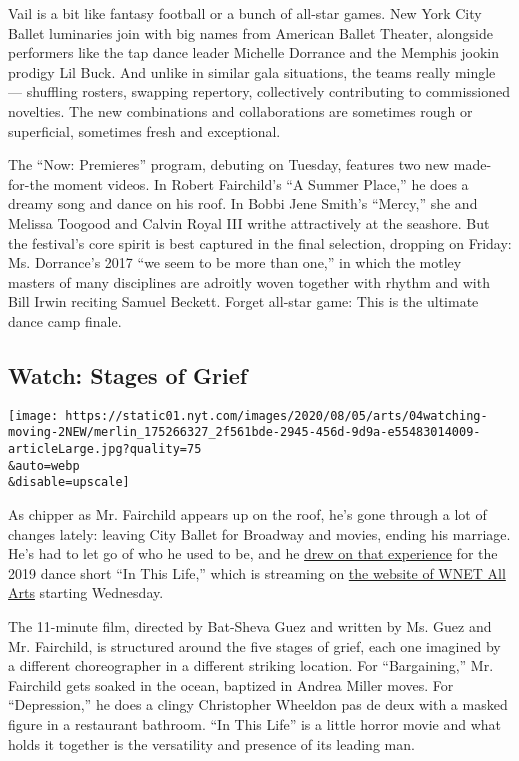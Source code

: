 Vail is a bit like fantasy football or a bunch of all-star games. New
York City Ballet luminaries join with big names from American Ballet
Theater, alongside performers like the tap dance leader Michelle
Dorrance and the Memphis jookin prodigy Lil Buck. And unlike in similar
gala situations, the teams really mingle --- shuffling rosters, swapping
repertory, collectively contributing to commissioned novelties. The new
combinations and collaborations are sometimes rough or superficial,
sometimes fresh and exceptional.

The ``Now: Premieres'' program, debuting on Tuesday, features two new
made-for-the moment videos. In Robert Fairchild's ``A Summer Place,'' he
does a dreamy song and dance on his roof. In Bobbi Jene Smith's
``Mercy,'' she and Melissa Toogood and Calvin Royal III writhe
attractively at the seashore. But the festival's core spirit is best
captured in the final selection, dropping on Friday: Ms. Dorrance's 2017
``we seem to be more than one,'' in which the motley masters of many
disciplines are adroitly woven together with rhythm and with Bill Irwin
reciting Samuel Beckett. Forget all-star game: This is the ultimate
dance camp finale.

\hypertarget{watch-stages-of-grief}{%
\subsection{Watch: Stages of Grief}\label{watch-stages-of-grief}}

\texttt{[image: https://static01.nyt.com/images/2020/08/05/arts/04watching-moving-2NEW/merlin\_175266327\_2f561bde-2945-456d-9d9a-e55483014009-articleLarge.jpg?quality=75\\\&auto=webp\\\&disable=upscale]}

As chipper as Mr. Fairchild appears up on the roof, he's gone through a
lot of changes lately: leaving City Ballet for Broadway and movies,
ending his marriage. He's had to let go of who he used to be, and he
\href{https://www.dancemagazine.com/robbie-fairchild-short-film-2639173287.html?rebelltitem=5\#rebelltitem5}{drew
on that experience} for the 2019 dance short ``In This Life,'' which is
streaming on
\href{https://allarts.org/programs/all-arts-performance-selects/life-fvtylu/}{the
website of WNET All Arts} starting Wednesday.

The 11-minute film, directed by Bat-Sheva Guez and written by Ms. Guez
and Mr. Fairchild, is structured around the five stages of grief, each
one imagined by a different choreographer in a different striking
location. For ``Bargaining,'' Mr. Fairchild gets soaked in the ocean,
baptized in Andrea Miller moves. For ``Depression,'' he does a clingy
Christopher Wheeldon pas de deux with a masked figure in a restaurant
bathroom. ``In This Life'' is a little horror movie and what holds it
together is the versatility and presence of its leading man.

